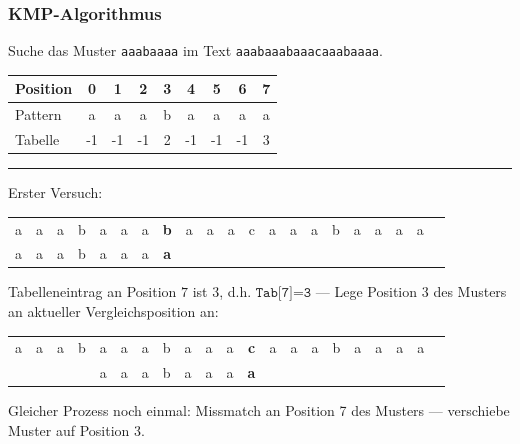 \documentclass{beamer}
\begin{document}
\begin{frame} \frametitle{KMP-Algorithmus}
	\small
	Suche das Muster \texttt{aaabaaaa} im Text \texttt{aaabaaabaaacaaabaaaa}.
	\begin{center}
		\footnotesize
		\begin{tabular}{l|cccccccc}
			Position &  0 &  1 &  2 &  3 &  4 &  5 &  6 &  7 \\ \hline
			Pattern  &  a &  a &  a &  b &  a &  a &  a &  a \\ \hline
			Tabelle  & -1 & -1 & -1 &  2 & -1 & -1 & -1 &  3 \\
		\end{tabular}
	\end{center}
	
	\rule{\textwidth}{0.4pt}
	
	\renewcommand*{\arraystretch}{.7}
	\setlength{\tabcolsep}{1pt}
	
	Erster Versuch:
	\begin{center}
		\begin{tabular}{ccccccccccccccccccccc}
			a & a & a & b & a & a & a & \textbf{b} & a & a & a & c & a & a & a & b & a & a & a & a \\
			a & a & a & b & a & a & a & \textbf{a}
		\end{tabular}
	\end{center}
	Tabelleneintrag an Position $7$ ist $3$, d.h. $\texttt{Tab[7]=3}$ --- Lege Position $3$ des Musters an aktueller Vergleichsposition an:
	\begin{center}
		\begin{tabular}{ccccccccccccccccccccc}
			a & a & a & b & a & a & a & b & a & a & a & \textbf{c} & a & a & a & b & a & a & a & a \\
			&   &   &   & a & a & a & b & a & a & a & \textbf{a}
		\end{tabular}
	\end{center}
	Gleicher Prozess noch einmal: Missmatch an Position 7 des Musters --- verschiebe Muster auf Position 3.
\end{frame}
\end{document}
